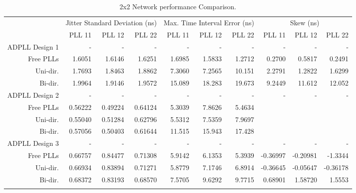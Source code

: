 \begin{table}[!ht]
    \begin{center}
        \begin{footnotesize}
            \setlength{\tabcolsep}{.9\tabcolsep}
            \begin{tabular}{ll|r|r|r|r|r|r|r|r|r|}           
                \cline{3-11}
                && \multicolumn{3}{c|}{Jitter Standard Deviation (ns)} & \multicolumn{3}{c|}{Max. Time Interval Error (ns)} & \multicolumn{3}{c|}{Skew (ns)} \T\\
                \cline{3-11} 
                &&PLL 11&PLL 12&PLL 22    &PLL 11&PLL 12&PLL 22    &PLL 11&PLL 12&PLL 22\T\\
                \hline
                \multicolumn{2}{|l|}{\ac{ADPLL} Design 1}&-&-&-&-&-&-&-&-&-\T\\
                \multicolumn{2}{|r|}{Free PLLs} &1.6051  &1.6146  &1.6251     &1.6985 &1.5833 &1.2712    &0.2700 &0.5817 &0.2491 \T\\
                \multicolumn{2}{|r|}{Uni-dir.}  &1.7693  &1.8463  &1.8862     &7.3060 &7.2565 &10.151    &2.2791 &1.2822 &1.6299 \T\\
                \multicolumn{2}{|r|}{Bi-dir.}   &1.9964  &1.9146  &1.9572     &15.089 &18.283 &19.673    &9.2449 &11.612 &12.052 \T\\
                \hline
                \multicolumn{2}{|l|}{\ac{ADPLL} Design 2}&-&-&-&-&-&-&-&-&-\T\\
                \multicolumn{2}{|r|}{Free PLLs} &0.56222 &0.49224 &0.64124    &5.3039 &7.8626 &5.4634    &&& \T\\
                \multicolumn{2}{|r|}{Uni-dir.}  &0.55040 &0.51284 &0.62796    &5.5312 &7.5359 &7.9697    &&& \T\\
                \multicolumn{2}{|r|}{Bi-dir.}   &0.57056 &0.50403 &0.61644    &11.515 &15.943 &17.428    &&& \T\\
                \hline
                \multicolumn{2}{|l|}{\ac{ADPLL} Design 3}&-&-&-&-&-&-&-&-&-\T\\
                \multicolumn{2}{|r|}{Free PLLs} &0.66757 &0.84477 &0.71308    &5.9142 &6.1353 &5.3939    &-0.36997 &-0.20981 &-1.3344  \T\\
                \multicolumn{2}{|r|}{Uni-dir.}  &0.66934 &0.83894 &0.71271    &5.8779 &7.1746 &6.8914    &-0.36645 &-0.05647 &-0.36178 \T\\
                \multicolumn{2}{|r|}{Bi-dir.}   &0.68372 &0.83193 &0.68570    &7.5705 &9.6292 &9.7715    & 0.68901 & 1.58720 & 1.5553  \T\\
                \hline
                \B                
            \end{tabular}
        \end{footnotesize}
        \caption{2x2 Network performance Comparison.}
        \label{table:2x2perf}
    \end{center}
    \vspace{-0.5cm}
\end{table}

